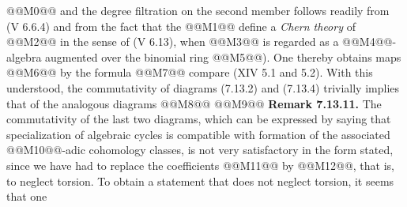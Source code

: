 @@M0@@ and the degree filtration on the second member follows readily from (V 6.6.4) and from the fact that the @@M1@@ define a \emph{Chern theory} of @@M2@@ in the sense of (V 6.13), when @@M3@@ is regarded as a @@M4@@-algebra augmented over the binomial ring @@M5@@). One thereby obtains maps
@@M6@@
by the formula
@@M7@@
compare (XIV 5.1 and 5.2). With this understood, the commutativity of diagrams (7.13.2) and (7.13.4) trivially implies that of the analogous diagrams
@@M8@@
@@M9@@
\textbf{Remark 7.13.11.} The commutativity of the last two diagrams, which can be expressed by saying that specialization of algebraic cycles is compatible with formation of the associated @@M10@@-adic cohomology classes, is not very satisfactory in the form stated, since we have had to replace the coefficients @@M11@@ by @@M12@@, that is, to neglect torsion. To obtain a statement that does not neglect torsion, it seems that one
